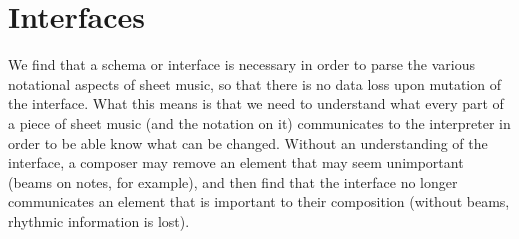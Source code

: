 \section{Interfaces}
We find that a schema or interface is necessary in order to parse the various notational aspects of sheet music, so that there is no data loss upon mutation of the interface.
What this means is that we need to understand what every part of a piece of sheet music (and the notation on it) communicates to the interpreter in order to be able know what can be changed.
Without an understanding of the interface, a composer may remove an element that may seem unimportant (beams on notes, for example), and then find that the interface no longer communicates an element that is important to their composition (without beams, rhythmic information is lost).